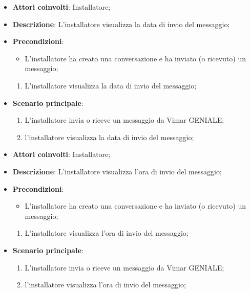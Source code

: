 \begin{itemize}
    \item \textbf{Attori coinvolti}: Installatore;
    \item \textbf{Descrizione}: L'installatore visualizza la data di invio del messaggio;
    \item \textbf{Precondizioni}:  
        \begin{itemize}
            \item L'installatore ha creato una conversazione e ha inviato (o ricevuto) un messaggio;
        \end{itemize}
    \begin{enumerate}
        \item L'installatore visualizza la data di invio del messaggio;
    \end{enumerate}
    \item \textbf{Scenario principale}:
    \begin{enumerate}
        \item L'installatore invia o riceve un messaggio da Vimar GENIALE;
        \item l'installatore visualizza la data di invio del messaggio;
    \end{enumerate}
\end{itemize}

\begin{itemize}
    \item \textbf{Attori coinvolti}: Installatore;
    \item \textbf{Descrizione}: L'installatore visualizza l'ora di invio del messaggio;
    \item \textbf{Precondizioni}:  
        \begin{itemize}
            \item L'installatore ha creato una conversazione e ha inviato (o ricevuto) un messaggio;
        \end{itemize}
    \begin{enumerate}
        \item L'installatore visualizza l'ora di invio del messaggio;
    \end{enumerate}
    \item \textbf{Scenario principale}:
    \begin{enumerate}
        \item L'installatore invia o riceve un messaggio da Vimar GENIALE;
        \item l'installatore visualizza l'ora di invio del messaggio;
    \end{enumerate}
\end{itemize}

